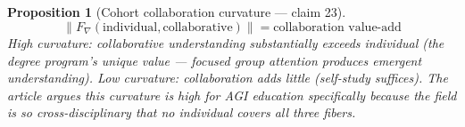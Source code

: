 \documentclass[11pt,a4paper]{article}
\newtheorem{proposition}[definition]{Proposition}
\begin{document}
\begin{proposition}[Cohort collaboration curvature --- claim 23]
\label{prop:collab_curv}
\[
  \|F_\nabla(\text{individual}, \text{collaborative})\| =
    \text{collaboration value-add}
\]
High curvature: collaborative understanding substantially exceeds
individual (the degree program's unique value --- focused group
attention produces emergent understanding). Low curvature: collaboration
adds little (self-study suffices). The article argues this curvature is
high for AGI education specifically because the field is so
cross-disciplinary that no individual covers all three fibers.
\end{proposition}
\end{document}
